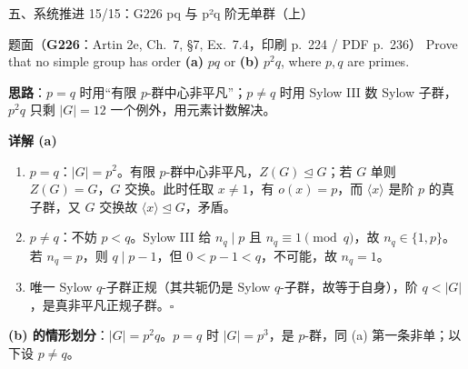 \documentclass[aspectratio=169,10pt,fontset=none]{ctexbeamer}
\newcommand{\ex}[1]{\textcolor{accent}{\footnotesize\bfseries #1}}
\newcommand{\key}[1]{\textcolor{ink}{\bfseries #1}}
\begin{document}
\begin{frame}[t]{五、系统推进 15/15：G226 pq 与 p²q 阶无单群（上）}
\label{ex:G226}\leavevmode
\scriptsize
\begin{block}{\footnotesize 题面（\ex{G226}：Artin 2e, Ch.~7, \S7, Ex.~7.4，印刷 p.~224 / PDF p.~236）}
Prove that no simple group has order \textbf{(a)} $pq$ or \textbf{(b)} $p^2q$, where $p,q$ are primes.
\end{block}
\key{思路}：$p=q$ 时用“有限 $p$-群中心非平凡”；$p\ne q$ 时用 Sylow III 数 Sylow 子群，$p^2q$ 只剩 $|G|=12$ 一个例外，用元素计数解决。

\key{详解 (a)}
\begin{enumerate}
  \item $p=q$：$|G|=p^2$。有限 $p$-群中心非平凡，$Z(G)\trianglelefteq G$；若 $G$ 单则 $Z(G)=G$，$G$ 交换。此时任取 $x\ne1$，有 $o(x)=p$，而 $\langle x\rangle$ 是阶 $p$ 的真子群，又 $G$ 交换故 $\langle x\rangle\trianglelefteq G$，矛盾。
  \item $p\ne q$：不妨 $p<q$。Sylow III 给 $n_q\mid p$ 且 $n_q\equiv1\pmod q$，故 $n_q\in\{1,p\}$。若 $n_q=p$，则 $q\mid p-1$，但 $0<p-1<q$，不可能，故 $n_q=1$。
  \item 唯一 Sylow $q$-子群正规（其共轭仍是 Sylow $q$-子群，故等于自身），阶 $q<|G|$，是真非平凡正规子群。$\square$
\end{enumerate}
\key{(b) 的情形划分}：$|G|=p^2q$。$p=q$ 时 $|G|=p^3$，是 $p$-群，同 (a) 第一条非单；以下设 $p\ne q$。
\end{frame}
\end{document}
